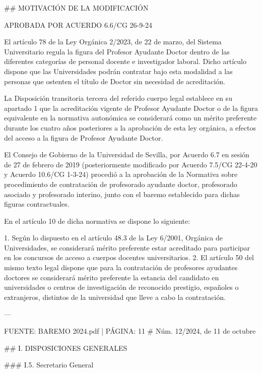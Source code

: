 \documentclass{article}
\begin{document}
\begin{itemize}
\begin{itemize}
\begin{scriptsize}
                  \#\# MOTIVACIÓN DE LA MODIFICACIÓN

                  APROBADA POR ACUERDO 6.6/CG 26-9-24

                  El artículo 78 de la Ley Orgánica 2/2023, de 22 de marzo, del Sistema Universitario regula la figura del Profesor Ayudante Doctor dentro de las diferentes categorías de personal docente e investigador laboral. Dicho artículo dispone que las Universidades podrán contratar bajo esta modalidad a las personas que ostenten el título de Doctor sin necesidad de acreditación.

                  La Disposición transitoria tercera del referido cuerpo legal establece en su apartado 1 que la acreditación vigente de Profesor Ayudante Doctor o de la figura equivalente en la normativa autonómica se considerará como un mérito preferente durante los cuatro años posteriores a la aprobación de esta ley orgánica, a efectos del acceso a la figura de Profesor Ayudante Doctor.

                  El Consejo de Gobierno de la Universidad de Sevilla, por Acuerdo 6.7 en sesión de 27 de febrero de 2019 (posteriormente modificado por Acuerdo 7.5/CG 22-4-20 y Acuerdo 10.6/CG 1-3-24) procedió a la aprobación de la Normativa sobre procedimiento de contratación de profesorado ayudante doctor, profesorado asociado y profesorado interino, junto con el baremo establecido para dichas figuras contractuales.

                  En el artículo 10 de dicha normativa se dispone lo siguiente:

                  1. Según lo dispuesto en el artículo 48.3 de la Ley 6/2001, Orgánica de Universidades, se considerará mérito preferente estar acreditado para participar en los concursos de acceso a cuerpos docentes universitarios.
                  2. El artículo 50 del mismo texto legal dispone que para la contratación de profesores ayudantes doctores se considerará mérito preferente la estancia del candidato en universidades o centros de investigación de reconocido prestigio, españoles o extranjeros, distintos de la universidad que lleve a cabo la contratación.

                  ---

                  FUENTE: BAREMO 2024.pdf | PÁGINA: 11
                  \# Núm. 12/2024, de 11 de octubre

                  \#\# I. DISPOSICIONES GENERALES

                  \#\#\# I.5. Secretario General


\end{scriptsize}
\end{itemize}
\end{itemize}
\end{document}
